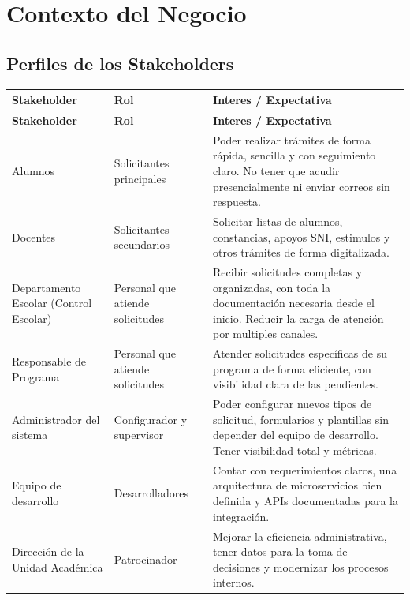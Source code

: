 \chapter{Contexto del Negocio}

\section{Perfiles de los Stakeholders}

\begin{longtable}{|L{3cm}|L{3.5cm}|L{7cm}|}
    \hline
    \textbf{Stakeholder} & \textbf{Rol} & \textbf{Interes / Expectativa} \\
    \hline
    \endfirsthead
    \hline
    \textbf{Stakeholder} & \textbf{Rol} & \textbf{Interes / Expectativa} \\
    \hline
    \endhead
    \hline
    \endfoot

    Alumnos & Solicitantes principales & Poder realizar trámites de forma rápida, sencilla y con seguimiento claro. No tener que acudir presencialmente ni enviar correos sin respuesta. \\
    \hline
    Docentes & Solicitantes secundarios & Solicitar listas de alumnos, constancias, apoyos SNI, estimulos y otros trámites de forma digitalizada. \\
    \hline
    Departamento Escolar (Control Escolar) & Personal que atiende solicitudes & Recibir solicitudes completas y organizadas, con toda la documentación necesaria desde el inicio. Reducir la carga de atención por multiples canales. \\
    \hline
    Responsable de Programa & Personal que atiende solicitudes & Atender solicitudes específicas de su programa de forma eficiente, con visibilidad clara de las pendientes. \\
    \hline
    Administrador del sistema & Configurador y supervisor & Poder configurar nuevos tipos de solicitud, formularios y plantillas sin depender del equipo de desarrollo. Tener visibilidad total y métricas. \\
    \hline
    Equipo de desarrollo & Desarrolladores & Contar con requerimientos claros, una arquitectura de microservicios bien definida y APIs documentadas para la integración. \\
    \hline
    Dirección de la Unidad Académica & Patrocinador & Mejorar la eficiencia administrativa, tener datos para la toma de decisiones y modernizar los procesos internos. \\
    \hline
\end{longtable}

